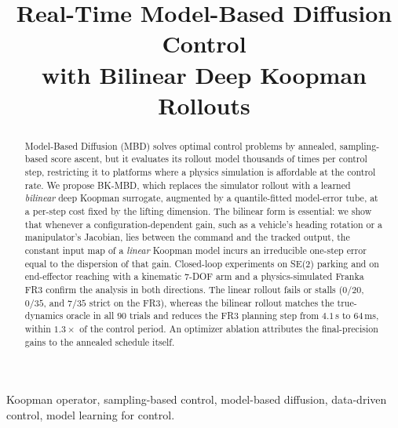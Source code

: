 \documentclass[lettersize,journal]{IEEEtran}
\theoremstyle{remark}
\newcommand{\todo}[1]{\textcolor{red}{\textbf{[TODO: #1]}}}
\newcommand{\bkmbd}{\textsc{BK-MBD}}
\begin{document}
\title{Real-Time Model-Based Diffusion Control\\
with Bilinear Deep Koopman Rollouts}


\maketitle

\begin{abstract}
Model-Based Diffusion (MBD) solves optimal control problems by annealed,
sampling-based score ascent, but it evaluates its rollout model thousands
of times per control step, restricting it to platforms where a physics
simulation is affordable at the control rate. We propose \bkmbd{}, which
replaces the simulator rollout with a learned \emph{bilinear} deep
Koopman surrogate, augmented by a quantile-fitted model-error tube, at a
per-step cost fixed by the lifting dimension. The bilinear form is
essential: we show that whenever a configuration-dependent gain, such
as a vehicle's heading rotation or a manipulator's Jacobian, lies
between the command and the tracked output, the constant input map of a
\emph{linear} Koopman model incurs an irreducible one-step error equal
to the dispersion of that gain. Closed-loop experiments on SE(2) parking and on
end-effector reaching with a kinematic $7$-DOF arm and a physics-simulated
Franka FR3 confirm the analysis in both directions. The linear rollout
fails or stalls ($0/20$, $0/35$, and $7/35$ strict on the FR3), whereas
the bilinear rollout matches the true-dynamics oracle in all $90$ trials
and reduces the FR3 planning step from $4.1$\,s to $64$\,ms, within
$1.3\times$ of the control period. An optimizer ablation attributes the
final-precision gains to the annealed schedule itself.
\end{abstract}

\begin{IEEEkeywords}
Koopman operator, sampling-based control, model-based diffusion, data-driven
control, model learning for control.
\end{IEEEkeywords}

\end{document}
